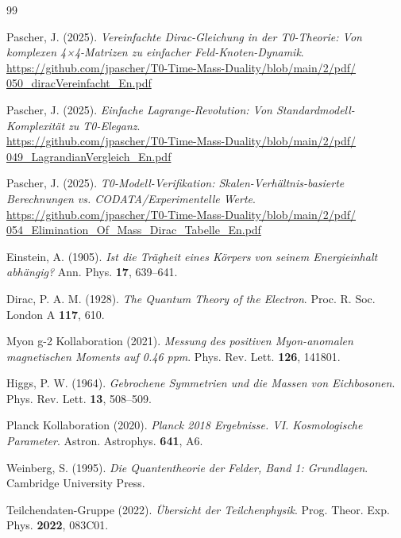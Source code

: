 \begin{thebibliography}{99}

Pascher, J. (2025). \textit{Vereinfachte Dirac-Gleichung in der T0-Theorie: Von komplexen 4×4-Matrizen zu einfacher Feld-Knoten-Dynamik}. \\
\href{https://github.com/jpascher/T0-Time-Mass-Duality/blob/main/2/pdf/050_diracVereinfacht_En.pdf}{https://github.com/jpascher/T0-Time-Mass-Duality/blob/main/2/pdf/\\050\_diracVereinfacht\_En.pdf}

Pascher, J. (2025). \textit{Einfache Lagrange-Revolution: Von Standardmodell-Komplexität zu T0-Eleganz}. \\
\href{https://github.com/jpascher/T0-Time-Mass-Duality/blob/main/2/pdf/049_LagrandianVergleich_En.pdf}{https://github.com/jpascher/T0-Time-Mass-Duality/blob/main/2/pdf/\\049\_LagrandianVergleich\_En.pdf}

Pascher, J. (2025). \textit{T0-Modell-Verifikation: Skalen-Verhältnis-basierte Berechnungen vs. CODATA/Experimentelle Werte}. \\
\href{https://github.com/jpascher/T0-Time-Mass-Duality/blob/main/2/pdf/054_Elimination_Of_Mass_Dirac_Tabelle_En.pdf}{https://github.com/jpascher/T0-Time-Mass-Duality/blob/main/2/pdf/\\054\_Elimination\_Of\_Mass\_Dirac\_Tabelle\_En.pdf}

Einstein, A. (1905). \textit{Ist die Trägheit eines Körpers von seinem Energieinhalt abhängig?} Ann. Phys. \textbf{17}, 639--641.

Dirac, P. A. M. (1928). \textit{The Quantum Theory of the Electron}. Proc. R. Soc. London A \textbf{117}, 610.

Myon g-2 Kollaboration (2021). \textit{Messung des positiven Myon-anomalen magnetischen Moments auf 0.46 ppm}. Phys. Rev. Lett. \textbf{126}, 141801.

Higgs, P. W. (1964). \textit{Gebrochene Symmetrien und die Massen von Eichbosonen}. Phys. Rev. Lett. \textbf{13}, 508--509.

Planck Kollaboration (2020). \textit{Planck 2018 Ergebnisse. VI. Kosmologische Parameter}. Astron. Astrophys. \textbf{641}, A6.

Weinberg, S. (1995). \textit{Die Quantentheorie der Felder, Band 1: Grundlagen}. Cambridge University Press.

Teilchendaten-Gruppe (2022). \textit{Übersicht der Teilchenphysik}. Prog. Theor. Exp. Phys. \textbf{2022}, 083C01.

\end{thebibliography}
	